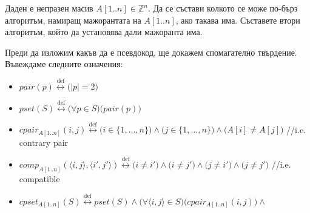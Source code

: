 \begin{problem}
	Даден е непразен масив $A[1..n]\in\mathbb{Z}^n$. Да се състави колкото се може по-бърз алгоритъм, намиращ мажорантата на $A[1..n]$, ако такава има. Съставете втори алгоритъм, който да установява дали мажоранта има.
\end{problem}
\begin{solution}
	Преди да изложим какъв да е псевдокод, ще докажем спомагателно твърдение. Въвеждаме следните означения:
	\begin{boxlocaldefinition*}{}{}
		\begin{itemize}
			\item $pair(p)\overset{\text{def}}\leftrightarrow\big(|p|=2\big)$
			\item $pset(S)\overset{\text{def}}\leftrightarrow\big(\forall p\in S\big)\big(pair(p)\big)$
			\item $cpair_{A[1..n]}(i,j)\!\overset{\text{def}}\leftrightarrow\!\big(i\!\in\!\{1,\dots,n\}\big)\!\land\!\big(j\!\in\!\{1,\dots,n\}\big)\!\land\!\big(A[i]\!\ne\! A[j]\big)$ //i.e. contrary pair
			\item $comp_{A[1..n]}(\langle i,j\rangle,\langle i',j'\rangle)\!\overset{\text{def}}\leftrightarrow\!\big(i\ne i'\big)\!\land\!\big(i\ne j'\big)\!\land\!\big(j\ne i'\big)\!\land\!\big(j\ne j'\big)$ //i.e. compatible
			\item $cpset_{A[1..n]}(S)\overset{\text{def}}\leftrightarrow pset(S)\land\big(\forall\langle i,j\rangle\in S\big)\big(cpair_{A[1..n]}(i,j)\big)\land$
			

\end{itemize}
\end{boxlocaldefinition*}
\end{solution}
